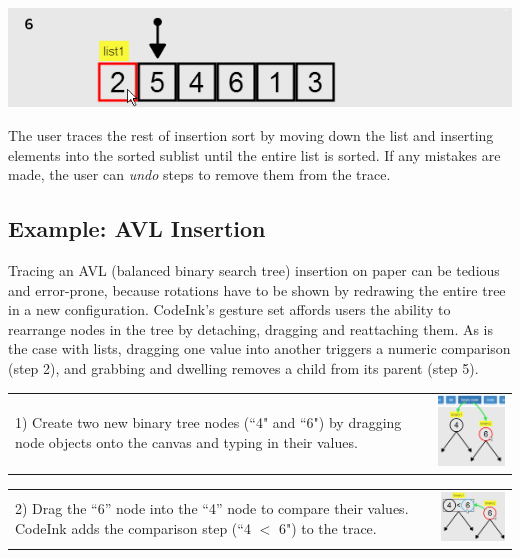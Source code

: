 \noindent \includegraphics[width=0.7\columnwidth]{img/examples/insertion-6.png}

The user traces the rest of insertion sort by moving down the list and inserting
elements into the sorted sublist until the entire list is sorted.
If any mistakes are made, the user can \emph{undo} steps to remove them from the
trace.

\subsection{Example: AVL Insertion}
Tracing an AVL (balanced binary search tree) insertion on paper can be tedious
and error-prone, because rotations have to be shown by redrawing the entire tree
in a new configuration. CodeInk's gesture set affords users the ability to
rearrange nodes in the tree by detaching, dragging and reattaching them.
As is the case with lists, dragging one value into another triggers a numeric
comparison (step 2), and grabbing and dwelling removes a child from its parent
(step 5).


\noindent \begin{tabular}{m{4.6cm} m{3.4cm}}

1) Create two new binary tree nodes (``4" and ``6") by dragging node
objects onto the canvas and typing in their values.

& \includegraphics[width=3.4cm]{img/examples/bst-1.png}
\end{tabular}


\noindent \begin{tabular}{m{4.6cm} m{3.4cm}}

2) Drag the ``6'' node into the ``4'' node to compare their values.
CodeInk adds the comparison step (``4 $<$ 6") to the trace.

& \includegraphics[width=3.4cm]{img/examples/bst-2.png}
\end{tabular}

